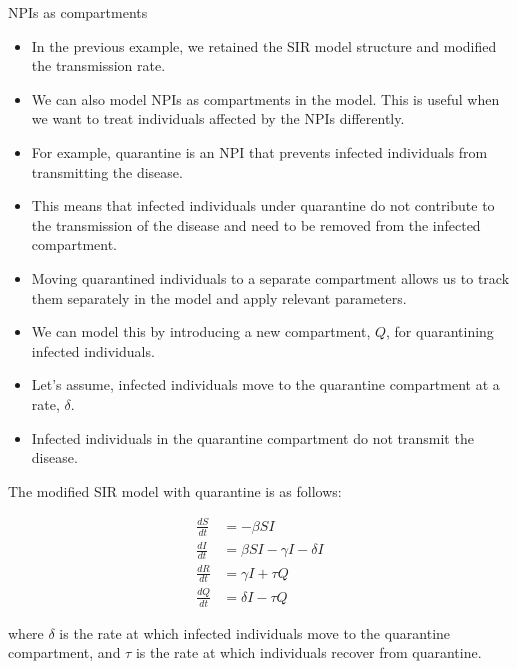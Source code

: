 \documentclass[
  ignorenonframetext,
]{beamer}
\begin{document}
\begin{frame}
\begin{block}{NPIs as compartments}
\label{npis-as-compartments}
\begin{itemize}
\item
  In the previous example, we retained the SIR model structure and
  modified the transmission rate.
\item
  We can also model NPIs as compartments in the model. This is useful
  when we want to treat individuals affected by the NPIs differently.
\end{itemize}
\end{block}
\end{frame}

\begin{frame}
\begin{itemize}
\item
  For example, quarantine is an NPI that prevents infected individuals
  from transmitting the disease.
\item
  This means that infected individuals under quarantine do not
  contribute to the transmission of the disease and need to be removed
  from the infected compartment.
\item
  Moving quarantined individuals to a separate compartment allows us to
  track them separately in the model and apply relevant parameters.
\end{itemize}
\end{frame}

\begin{frame}
\begin{itemize}
\item
  We can model this by introducing a new compartment, \(Q\), for
  quarantining infected individuals.
\item
  Let's assume, infected individuals move to the quarantine compartment
  at a rate, \(\delta\).
\item
  Infected individuals in the quarantine compartment do not transmit the
  disease.
\end{itemize}
\end{frame}

\begin{frame}
The modified SIR model with quarantine is as follows:

\begin{align*}
\frac{dS}{dt} & = -\beta S I \\
\frac{dI}{dt} & = \beta S I - \gamma I - \delta I \\
\frac{dR}{dt} & = \gamma I + \tau Q \\
\frac{dQ}{dt} & = \delta I - \tau Q
\end{align*}

where \(\delta\) is the rate at which infected individuals move to the
quarantine compartment, and \(\tau\) is the rate at which individuals
recover from quarantine.
\end{frame}
\end{document}
